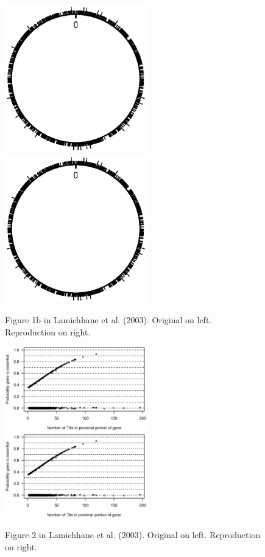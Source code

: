 \begin{figure}
\includegraphics[viewport=179 299 438 517, width=0.55\textwidth]{../talk/Figs/circlefig.ps}
\hfill
\includegraphics[viewport=179 299 438 517, width=0.55\textwidth]{../reproduction/Figs/circlefig.ps}

\caption{Figure 1b in Lamichhane et al. (2003). Original on left. Reproduction on right.}
\end{figure}



\begin{figure}
\includegraphics[viewport=44 245 525 508, width=0.55\textwidth]{../original/Nov02/R/Figs/fig2.ps}
\hfill
\includegraphics[viewport=44 245 525 508, width=0.55\textwidth]{../reproduction/Figs/fig2.ps}

\caption{Figure 2 in Lamichhane et al. (2003). Original on left. Reproduction on right.}
\end{figure}
